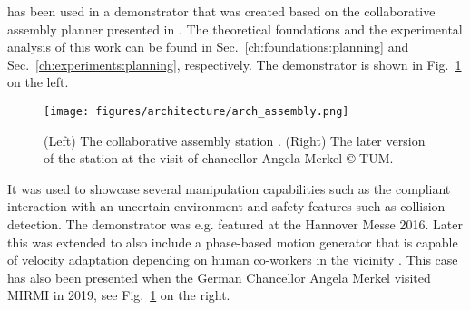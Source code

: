 \softwareabbr{} has been used in a demonstrator that was created based on the collaborative assembly planner presented in \cite{Johannsmeier.2017}.
The theoretical foundations and the experimental analysis of this work can be found in Sec.~\ref{ch:foundations:planning} and Sec.~\ref{ch:experiments:planning}, respectively.
The demonstrator is shown in Fig.~\ref{fig:architecture:system:assembly} on the left.

\begin{figure}[ht!]
    \texttt{[image: figures/architecture/arch\_assembly.png]}
    \caption{(Left) The collaborative assembly station \cite{Johannsmeier.2017}. (Right) The later version of the station at the visit of chancellor Angela Merkel \copyright{} TUM.}
    \label{fig:architecture:system:assembly}
\end{figure}

It was used to showcase several manipulation capabilities such as the compliant interaction with an uncertain environment and safety features such as collision detection.
The demonstrator was e.g. featured at the Hannover Messe 2016.
Later this was extended to also include a phase-based motion generator that is capable of velocity adaptation depending on human co-workers in the vicinity \cite{zardykhan2019collision}.
This case has also been presented when the German Chancellor Angela Merkel visited MIRMI in 2019, see Fig.~\ref{fig:architecture:system:assembly} on the right.